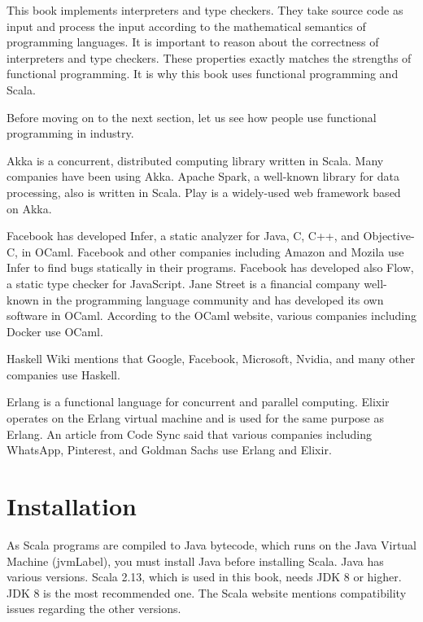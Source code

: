 This book implements interpreters and type checkers. They take source code as
input and process the input according to the mathematical semantics of programming
languages. It is important
to reason about the correctness of interpreters and type checkers. These
properties exactly matches the strengths of functional programming. It is why
this book uses functional programming and Scala.

Before moving on to the next section,
let us see how people use functional programming in industry.

Akka is a concurrent,
distributed computing library written in Scala. Many companies have been using Akka.
Apache Spark, a well-known library for data
processing, also is written in Scala.
Play
is a widely-used web framework based on Akka.

Facebook has developed Infer, a static analyzer for Java,
C, C++, and Objective-C, in OCaml. Facebook and other companies including Amazon
and Mozila use Infer to find bugs statically in their programs. Facebook has
developed also Flow, a static type checker for JavaScript.
Jane Street is a financial company well-known in
the programming language community and has developed its own software in OCaml.
According to the OCaml website,
various companies including Docker use OCaml.

Haskell Wiki mentions that Google,
Facebook, Microsoft, Nvidia, and many other companies use Haskell.

Erlang is a functional language for concurrent and parallel computing. Elixir
operates on the Erlang virtual machine and is used for the same purpose as Erlang.
An article from Code
Sync
said that various companies including WhatsApp, Pinterest, and Goldman Sachs
use Erlang and Elixir.

\section{Installation}

As Scala programs are compiled to Java bytecode, which runs on the Java Virtual
Machine (\acrshort{jvmLabel}), you must
install Java before installing Scala. Java has various versions. Scala 2.13,
which is used in this book, needs JDK 8 or higher. JDK 8 is the most recommended
one. The Scala website
mentions compatibility issues regarding the other versions.

